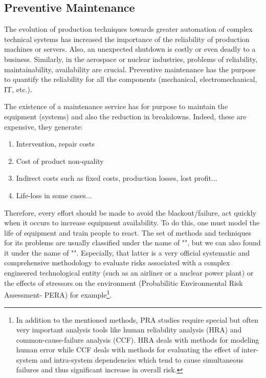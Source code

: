 	\subsection{Preventive Maintenance}\label{preventive maintenance}
	The evolution of production techniques towards greater automation of complex technical systems has increased the importance of the reliability of production machines or servers. Also, an unexpected shutdown is costly or even deadly to a business. Similarly, in the aerospace or nuclear industries, problems of reliability, maintainability, availability are crucial. Preventive maintenance has the purpose to quantify the reliability for all the components (mechanical, electromechanical, IT, etc.).
	
	The existence of a maintenance service has for purpose to maintain the equipment (systems) and also the reduction in breakdowns. Indeed, these are expensive, they generate:
	\begin{enumerate}
		\item Intervention, repair costs		
		\item Cost of product non-quality		
		\item Indirect costs such as fixed costs, production losses, lost profit...
		\item Life-loss in some cases...
	\end{enumerate}
	Therefore, every effort should be made to avoid the blackout/failure, act quickly when it occurs to increase equipment availability. To do this, one must model the life of equipment and train people to react. The set of methods and techniques for its problems are usually classified under the name of "", but we can also found it under the name of "". Especially, that latter is a very official systematic and comprehensive methodology to evaluate risks associated with a complex engineered technological entity (such as an airliner or a nuclear power plant) or the effects of stressors on the environment (Probabilitic Environmental Risk Assessment- PERA) for example\footnote{In addition to the mentioned methods, PRA studies require special but often very important analysis tools like human reliability analysis (HRA) and common-cause-failure analysis (CCF). HRA deals with methods for modeling human error while CCF deals with methods for evaluating the effect of inter-system and intra-system dependencies which tend to cause simultaneous failures and thus significant increase in overall risk.}.
	
